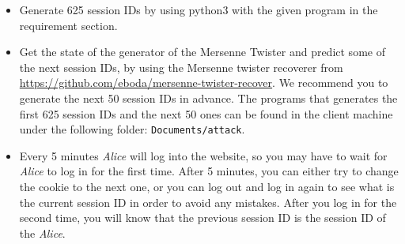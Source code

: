 \documentclass[11pt]{article}
\begin{document}
\begin{itemize}
\item Generate 625 session IDs by using python3 with the given program in the requirement section.
 
\item Get the state of the generator of the Mersenne Twister and predict some of the next session IDs, by using the Mersenne twister recoverer from \url{https://github.com/eboda/mersenne-twister-recover}. We recommend you to generate the next 50 session IDs in advance. The programs that generates the first 625 session IDs and the next 50 ones can be found in the client machine under the following folder: \texttt{Documents/attack}.

\item Every 5 minutes \textit{Alice} will log into the website, so you may have to wait for \textit{Alice} to log in for the first time. After 5 minutes, you can either try to change the cookie to the next one, or you can log out and log in again to see what is the current session ID in order to avoid any mistakes. After you log in for the second time, you will know that the previous session ID is the session ID of the \textit{Alice}.  
 

\end{itemize}
\end{document}
